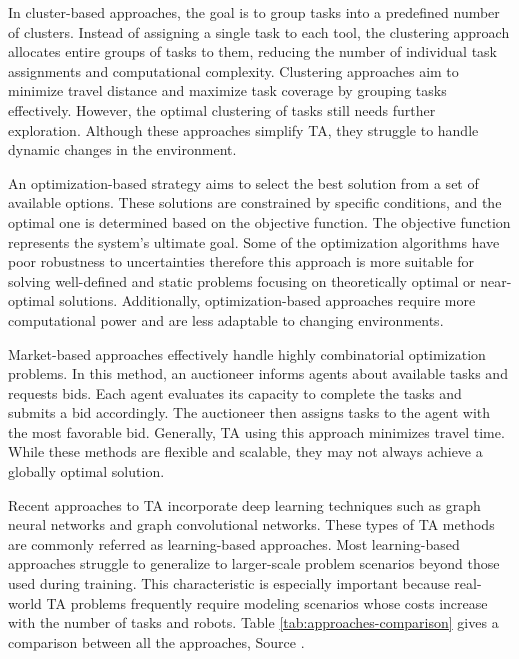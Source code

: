 In cluster-based approaches, the goal is to group tasks into a predefined number of clusters. Instead of assigning a single task to each tool, the clustering approach allocates entire groups of tasks to them, reducing the number of individual task assignments and computational complexity. Clustering approaches aim to minimize travel distance and maximize task coverage by grouping tasks effectively. However, the optimal clustering of tasks still needs further exploration. Although these approaches simplify \ac{TA}, they struggle to handle dynamic changes in the environment.

An optimization-based strategy aims to select the best solution from a set of available options. These solutions are constrained by specific conditions, and the optimal one is determined based on the objective function. The objective function represents the system's ultimate goal. Some of the optimization algorithms have poor robustness to uncertainties therefore this approach is more suitable for solving well-defined and static problems focusing on theoretically optimal or near-optimal solutions. Additionally, optimization-based approaches require more computational power and are less adaptable to changing environments.

Market-based approaches effectively handle highly combinatorial optimization problems. In this method, an auctioneer informs agents about available tasks and requests bids. Each agent evaluates its capacity to complete the tasks and submits a bid accordingly. The auctioneer then assigns tasks to the agent with the most favorable bid. Generally, \ac{TA} using this approach minimizes travel time. While these methods are flexible and scalable, they may not always achieve a globally optimal solution.

Recent approaches to \ac{TA} incorporate deep learning techniques such as graph neural networks and graph convolutional networks. These types of \ac{TA} methods are commonly referred as learning-based approaches. Most learning-based approaches struggle to generalize to larger-scale problem scenarios beyond those used during training. This characteristic is especially important because real-world \ac{TA} problems frequently require modeling scenarios whose costs increase with the number of tasks and robots. Table \ref{tab:approaches-comparison} gives a comparison between all the approaches, Source \cite{Umashankar2024}.


